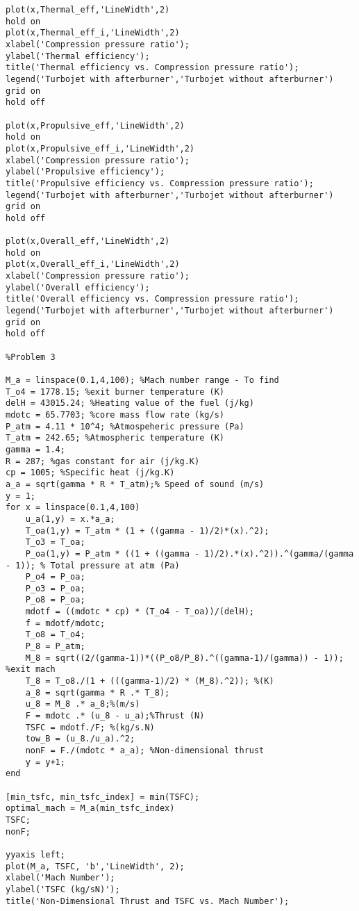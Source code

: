 \documentclass[]{article}
\theoremstyle{definition}
\begin{document}
\begin{lstlisting}[style=Matlab-editor]
plot(x,Thermal_eff,'LineWidth',2)
hold on 
plot(x,Thermal_eff_i,'LineWidth',2)
xlabel('Compression pressure ratio');
ylabel('Thermal efficiency');
title('Thermal efficiency vs. Compression pressure ratio');
legend('Turbojet with afterburner','Turbojet without afterburner')
grid on
hold off

plot(x,Propulsive_eff,'LineWidth',2)
hold on 
plot(x,Propulsive_eff_i,'LineWidth',2)
xlabel('Compression pressure ratio');
ylabel('Propulsive efficiency');
title('Propulsive efficiency vs. Compression pressure ratio');
legend('Turbojet with afterburner','Turbojet without afterburner')
grid on
hold off

plot(x,Overall_eff,'LineWidth',2)
hold on 
plot(x,Overall_eff_i,'LineWidth',2)
xlabel('Compression pressure ratio');
ylabel('Overall efficiency');
title('Overall efficiency vs. Compression pressure ratio');
legend('Turbojet with afterburner','Turbojet without afterburner')
grid on
hold off

%Problem 3

M_a = linspace(0.1,4,100); %Mach number range - To find
T_o4 = 1778.15; %exit burner temperature (K)
delH = 43015.24; %Heating value of the fuel (j/kg)
mdotc = 65.7703; %core mass flow rate (kg/s)
P_atm = 4.11 * 10^4; %Atmospeheric pressure (Pa)
T_atm = 242.65; %Atmospheric temperature (K)
gamma = 1.4;
R = 287; %gas constant for air (j/kg.K)
cp = 1005; %Specific heat (j/kg.K)
a_a = sqrt(gamma * R * T_atm);% Speed of sound (m/s)
y = 1;
for x = linspace(0.1,4,100)
    u_a(1,y) = x.*a_a;
    T_oa(1,y) = T_atm * (1 + ((gamma - 1)/2)*(x).^2);
    T_o3 = T_oa;
    P_oa(1,y) = P_atm * ((1 + ((gamma - 1)/2).*(x).^2)).^(gamma/(gamma - 1)); % Total pressure at atm (Pa)
    P_o4 = P_oa;
    P_o3 = P_oa;
    P_o8 = P_oa;
    mdotf = ((mdotc * cp) * (T_o4 - T_oa))/(delH);
    f = mdotf/mdotc;
    T_o8 = T_o4;
    P_8 = P_atm;
    M_8 = sqrt((2/(gamma-1))*((P_o8/P_8).^((gamma-1)/(gamma)) - 1)); %exit mach
    T_8 = T_o8./(1 + (((gamma-1)/2) * (M_8).^2)); %(K)
    a_8 = sqrt(gamma * R .* T_8);
    u_8 = M_8 .* a_8;%(m/s)
    F = mdotc .* (u_8 - u_a);%Thrust (N)
    TSFC = mdotf./F; %(kg/s.N)
    tow_B = (u_8./u_a).^2;
    nonF = F./(mdotc * a_a); %Non-dimensional thrust
    y = y+1;
end

[min_tsfc, min_tsfc_index] = min(TSFC);
optimal_mach = M_a(min_tsfc_index)
TSFC;
nonF;

yyaxis left;
plot(M_a, TSFC, 'b','LineWidth', 2);
xlabel('Mach Number');
ylabel('TSFC (kg/sN)');
title('Non-Dimensional Thrust and TSFC vs. Mach Number');


\end{lstlisting}
\end{document}
